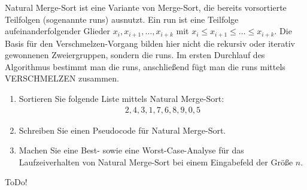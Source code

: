 
\begin{exercise}

Natural Merge-Sort ist eine Variante von Merge-Sort, die bereits vorsortierte Teilfolgen
(sogenannte runs) ausnutzt. Ein run ist eine Teilfolge aufeinanderfolgender Glieder $x_i, x_{i+1}, \dots, x_{i+k}$ mit $x_i \leq x_{i+1} \leq \dots \leq x_{i+k}$. Die Basis für den Verschmelzen-Vorgang bilden hier nicht
die rekursiv oder iterativ gewonnenen Zweiergruppen, sondern die runs. Im ersten Durchlauf des Algorithmus
bestimmt man die runs, anschließend fügt man die runs mittels VERSCHMELZEN zusammen.

\begin{enumerate}[label = (\alph*)]
  \item Sortieren Sie folgende Liste mittels Natural Merge-Sort:
  \begin{align}
    2,4,3,1,7,6,8,9,0,5
  \end{align}
  \item Schreiben Sie einen Pseudocode für Natural Merge-Sort.
  \item Machen Sie eine Best- sowie eine Worst-Case-Analyse für das Laufzeiverhalten von Natural Merge-Sort
  bei einem Eingabefeld der Größe $n$.
\end{enumerate}
\end{exercise}


\begin{solution}

ToDo!

\end{solution}

